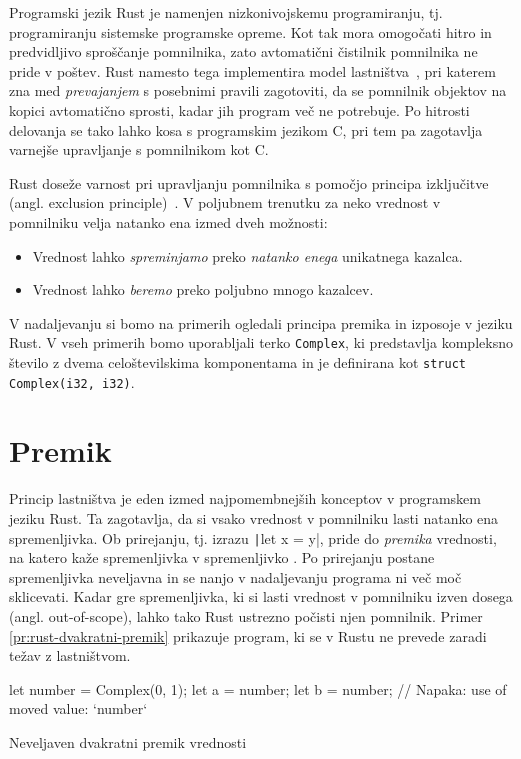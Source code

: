 Programski jezik Rust je namenjen nizkonivojskemu programiranju, tj. programiranju sistemske programske opreme. Kot tak mora omogočati hitro in predvidljivo sproščanje pomnilnika, zato avtomatični čistilnik pomnilnika ne pride v poštev. Rust namesto tega implementira model lastništva~\cite{klabnik2023rust}, pri katerem zna med \textit{prevajanjem} s posebnimi pravili zagotoviti, da se pomnilnik objektov na kopici avtomatično sprosti, kadar jih program več ne potrebuje. Po hitrosti delovanja se tako lahko kosa s programskim jezikom C, pri tem pa zagotavlja varnejše upravljanje s pomnilnikom kot C.

Rust doseže varnost pri upravljanju pomnilnika s pomočjo principa izključitve (angl. exclusion
principle)~\cite{jung2020understanding}. V poljubnem trenutku za neko vrednost v pomnilniku velja natanko ena izmed dveh možnosti:

\begin{itemize}
	\itemsep 0em
	\item Vrednost lahko \textit{spreminjamo} preko \textit{natanko enega} unikatnega kazalca.
	\item Vrednost lahko \textit{beremo} preko poljubno mnogo kazalcev.
\end{itemize}

V nadaljevanju si bomo na primerih ogledali principa premika in izposoje v jeziku Rust. V vseh primerih bomo uporabljali terko \texttt{Complex}, ki predstavlja kompleksno število z dvema celoštevilskima komponentama in je definirana kot \texttt{struct Complex(i32, i32)}.

\section{Premik}

Princip lastništva je eden izmed najpomembnejših konceptov v programskem jeziku Rust. Ta zagotavlja, da si vsako vrednost v pomnilniku lasti natanko ena spremenljivka. Ob prirejanju, tj. izrazu \texttt|let x = y|, pride do \textit{premika} vrednosti, na katero kaže spremenljivka  v spremenljivko . Po prirejanju postane spremenljivka  neveljavna in se nanjo v nadaljevanju programa ni več moč sklicevati. Kadar gre spremenljivka, ki si lasti vrednost v pomnilniku izven dosega (angl. out-of-scope), lahko tako Rust ustrezno počisti njen pomnilnik. Primer \ref{pr:rust-dvakratni-premik} prikazuje program, ki se v Rustu ne prevede zaradi težav z lastništvom.

\begin{primer}[ht]
\centering
\begin{rust-failure}
let number = Complex(0, 1);
let a = number;
let b = number;  // Napaka: use of moved value: `number`
\end{rust-failure}
\caption{Neveljaven dvakratni premik vrednosti}
\label{pr:rust-dvakratni-premik}
\end{primer}

